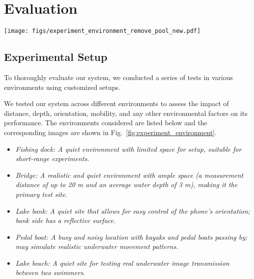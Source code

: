 \section{Evaluation}
\label{sec:evaluation}

\begin{figure*}[t]
    \centering
    \texttt{[image: figs/experiment\_environment\_remove\_pool\_new.pdf]}
    \vspace{-30pt}
    \caption{Experimental environments from left to right: fishing dock,
    bridge, lake bank, pedal boat, and lake beach. The remaining images show
    a prototype of \sysname and the mounting setup used to secure phones
    to the measurement tool when close to and when far from the water.}
\label{fig:experiment_environment}

\end{figure*}

\subsection{Experimental Setup}
To thoroughly evaluate our system, we conducted a series of tests in various environments using customized setups.

We tested our system across different environments to assess the impact of distance, depth, orientation, mobility, and any other environmental factors on its performance. The environments considered are listed below and the corresponding images are shown in Fig.~\ref{fig:experiment_environment}.

\begin{itemize}[leftmargin=*]
    \item \em{Fishing dock:} A quiet environment with limited space for setup, suitable for short-range experiments.
    \item \em{Bridge:} A realistic and quiet environment with ample space
    (a measurement distance of up to 20 m and an average water depth of 3 m),
    making it the primary test site.
    \item \em{Lake bank:} A quiet site that allows for easy control of the phone's orientation; bank side has a reflective surface.
    \item \em{Pedal boat:} A busy and noisy location with kayaks and pedal boats passing by; may simulate realistic underwater movement patterns.
    \item \em{Lake beach:} A quiet site for testing real underwater image transmission between two swimmers.
\end{itemize}

